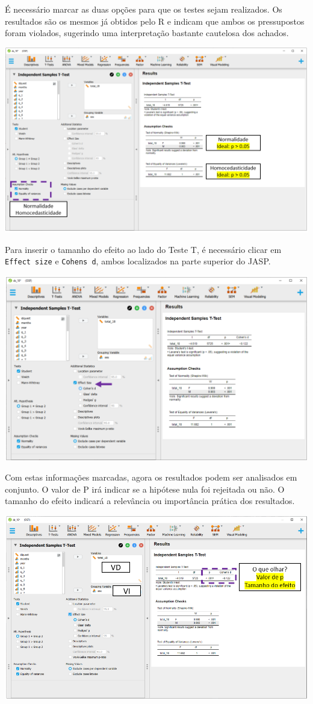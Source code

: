 \documentclass[
]{book}
\begin{document}
É necessário marcar as duas opções para que os testes sejam realizados. Os resultados são os mesmos já obtidos pelo R e indicam que ambos os pressupostos foram violados, sugerindo uma interpretação bastante cautelosa dos achados.

\includegraphics{./img/cap_testet_pressupostos2.png}

Para inserir o tamanho do efeito ao lado do Teste T, é necessário clicar em \texttt{Effect\ size} e \texttt{Cohen\textquotesingle{}s\ d}, ambos localizados na parte superior do JASP.

\includegraphics{./img/cap_testet_tamanho_do_efeito.png}

Com estas informações marcadas, agora os resultados podem ser analisados em conjunto. O valor de P irá indicar se a hipótese nula foi rejeitada ou não. O tamanho do efeito indicará a relevância ou importância prática dos resultados.

\includegraphics{./img/cap_testet_resultados.png}
\end{document}
